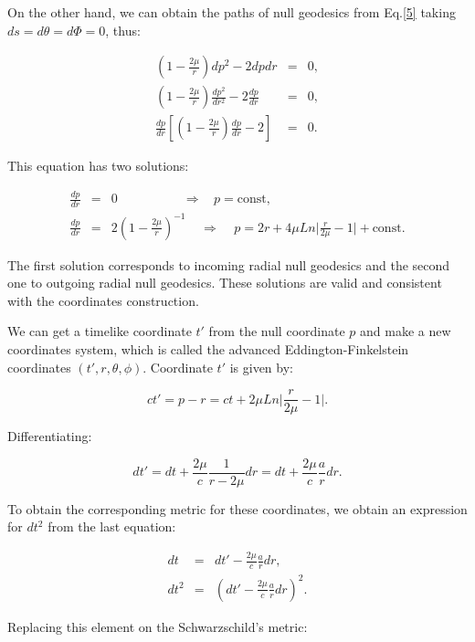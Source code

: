 \documentclass[letterpaper,11pt,onecolumn]{article}
\begin{document}
On the other hand, we can obtain the paths of null geodesics from Eq.\ref{5} taking $ds=d\theta=d\Phi=0$, thus:

\begin{eqnarray*}
\left( 1 - \frac{2\mu}{r}\right)dp^2-2dpdr&=&0,\\
\left( 1 - \frac{2\mu}{r}\right)\frac{dp^2}{dr^2}-2\frac{dp}{dr}&=&0,\\
\frac{dp}{dr}\left[\left( 1 - \frac{2\mu}{r}\right)\frac{dp}{dr}-2\right]&=&0.
\end{eqnarray*}

This equation has two solutions:

\begin{eqnarray*}
\frac{dp}{dr}&=&0  \ \ \ \ \ \ \ \  \ \ \ \ \ \ \ \ \ \ \ \ \ \ \ \Rightarrow \ \ \ \  p=\text{const}, \\
\frac{dp}{dr}&=&2\left( 1 - \frac{2\mu}{r}\right)^{-1}
 \ \ \ \ \ \Rightarrow \ \ \ \ \ p=2r+4\mu Ln\Big| \frac{r}{2\mu}-1 \Big|+ \text{const}. 
\end{eqnarray*} 

The first solution corresponds to incoming radial null geodesics and the second one to outgoing radial null geodesics. These solutions are valid and consistent with the coordinates construction.

We can get a timelike coordinate $t'$ from the null coordinate $p$ and make a new coordinates system, which is called the advanced Eddington-Finkelstein coordinates $(t',r,\theta,\phi)$. Coordinate $t'$ is given by:

\begin{equation}
    ct'= p-r=ct+2\mu Ln\Big| \frac{r}{2\mu}-1 \Big|.
\end{equation}

Differentiating:

\begin{equation*}
    dt'= dt +\frac{2\mu}{c}\frac{1}{r-2\mu}dr=dt+\frac{2\mu}{c}\frac{a}{r}dr.
\end{equation*}

To obtain the corresponding metric for these coordinates, we obtain an expression for $dt^2$ from the last equation:

\begin{eqnarray*}
    dt&=& dt' -\frac{2\mu}{c}\frac{a}{r}dr, \\
    dt^{2}&=& \left(dt' -\frac{2\mu}{c}\frac{a}{r}dr\right)^2.
\end{eqnarray*}

Replacing this element on the Schwarzschild's metric:
\end{document}

